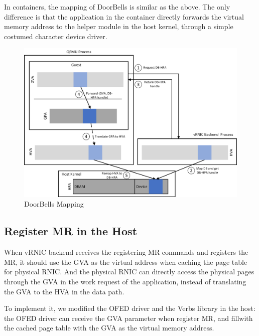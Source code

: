 In containers, the mapping of DoorBells is similar as the above. The only difference is that the application in the container directly forwards the virtual memory address to the helper module in the host kernel, through a simple costumed  character device driver. 

\begin{figure}[!ht]
	\centering
	\includegraphics[width=1\linewidth]{images/db-map.png}
	\caption{DoorBells Mapping}
	\label{fig:db-map}
\end{figure}

\subsection{Register MR in the Host}

When vRNIC backend receives the registering MR commands and registers the MR, it should use the GVA as the virtual address when caching the page table for physical RNIC. And the physical RNIC can directly access the physical pages through the GVA in the work request of the application, instead of translating the GVA to the HVA in the data path. 

To implement it, we modified the OFED driver and the Verbs library in the host: the OFED driver can receive the GVA parameter when register MR, and fillwith the cached page table with the GVA as the virtual memory address.